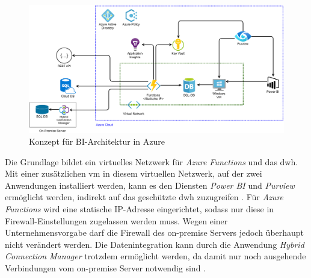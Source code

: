  \begin{figure}[htbp]
 \centering
 \includegraphics[width=\textwidth]{gfx/konzept_2.png}
 \caption{Konzept für BI-Architektur in Azure}
\label{fig:chap03_4_konzeptArchitektur}
\end{figure}

Die Grundlage bildet ein virtuelles Netzwerk für \textit{Azure Functions} und das \ac{dwh}. Mit einer zusätzlichen \ac{vm} in diesem virtuellen Netzwerk, auf der zwei Anwendungen installiert werden, kann es den Diensten \textit{Power BI} und \textit{Purview} ermöglicht werden, indirekt auf das geschützte \ac{dwh} zuzugreifen \cite[vgl.][]{gunnarsson_pro_2020, msdoc_22_purviewSHIR}. Für \textit{Azure Functions} wird eine statische IP-Adresse eingerichtet, sodass nur diese in Firewall-Einstellungen zugelassen werden muss. Wegen einer Unternehmensvorgabe darf die Firewall des on-premise Servers jedoch überhaupt nicht verändert werden. Die Datenintegration kann durch die Anwendung \textit{Hybrid Connection Manager} trotzdem ermöglicht werden, da damit nur noch ausgehende Verbindungen vom on-premise Server notwendig sind \cite[vgl.][]{msdoc_22_func_hybridConn}.